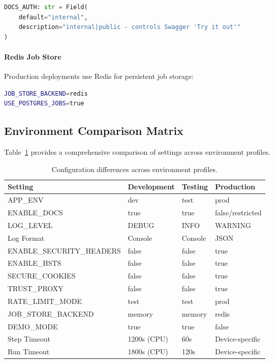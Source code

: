 \begin{lstlisting}[language=Python, caption=Documentation access control]
DOCS_AUTH: str = Field(
    default="internal",
    description="internal|public - controls Swagger 'Try it out'"
)
\end{lstlisting}

\paragraph{Redis Job Store}
Production deployments use Redis for persistent job storage:

\begin{lstlisting}[language=bash, caption=Production job store configuration]
JOB_STORE_BACKEND=redis
USE_POSTGRES_JOBS=true
\end{lstlisting}

\subsection{Environment Comparison Matrix}

Table~\ref{tab:env-comparison} provides a comprehensive comparison of settings across environment profiles.

\begin{table}[ht]
\centering
\caption{Configuration differences across environment profiles.}
\label{tab:env-comparison}
\small
\begin{tabular}{llll}
\hline
\textbf{Setting} & \textbf{Development} & \textbf{Testing} & \textbf{Production} \\
\hline
APP\_ENV & dev & test & prod \\
ENABLE\_DOCS & true & true & false/restricted \\
LOG\_LEVEL & DEBUG & INFO & WARNING \\
Log Format & Console & Console & JSON \\
ENABLE\_SECURITY\_HEADERS & false & false & true \\
ENABLE\_HSTS & false & false & true \\
SECURE\_COOKIES & false & false & true \\
TRUST\_PROXY & false & false & true \\
RATE\_LIMIT\_MODE & test & test & prod \\
JOB\_STORE\_BACKEND & memory & memory & redis \\
DEMO\_MODE & true & true & false \\
Step Timeout & 1200s (CPU) & 60s & Device-specific \\
Run Timeout & 1800s (CPU) & 120s & Device-specific \\
\hline
\end{tabular}
\end{table}

